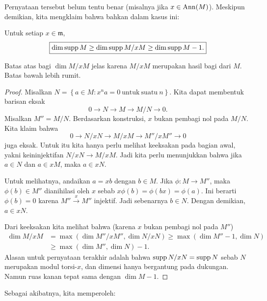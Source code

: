 Pernyataan tersebut belum tentu benar (misalnya jika $x \in \operatorname{Ann}(M)$). Meskipun demikian, kita mengklaim
bahwa bahkan dalam kasus ini:
\begin{proposition} 
Untuk setiap $x \in \mathfrak{m}$,
\[ \boxed{ \mathrm{dim} \operatorname{supp} M \geq \mathrm{dim} \operatorname{supp} M/xM \geq \mathrm{dim} \operatorname{supp} M -1 .}\]
\end{proposition} 
Batas atas bagi $\dim M/xM$ jelas karena $M/xM$ merupakan hasil bagi dari $M$. Batas
bawah lebih rumit. 

\begin{proof} 
Misalkan $N = \left\{a \in M: x^n a = 0 \ \mathrm{untuk \ suatu \ } n \right\}$. Kita dapat
membentuk barisan eksak
\[ 0 \to N \to M \to M/N \to 0.  \]
Misalkan $M'' = M/N$.
Berdasarkan konstruksi, $x$ bukan pembagi nol pada $M/N$. Kita klaim bahwa 
\[ 0 \to N/xN \to M/xM \to M''/xM'' \to 0  \]
juga eksak. Untuk itu kita hanya perlu melihat keeksakan pada bagian awal,
yakni keininjektifan $N/xN \to M/xM$. Jadi
kita perlu menunjukkan bahwa jika $a \in N$ dan $a \in xM$, maka $a \in x N$.

Untuk melihatnya, andaikan $a = xb$ dengan $b \in M$. Jika $\phi: M \to M''$, maka
$\phi(b) \in M''$ dianihilasi oleh $x$ sebab $x \phi(b) = \phi(bx) = \phi(a)$.
Ini berarti $\phi(b)=0$ karena $M'' \stackrel{x}{\to} M''$ injektif. Jadi
sebenarnya $b \in N$. Dengan demikian, $a \in xN$.

Dari keeksakan kita melihat bahwa (karena $x$ bukan pembagi nol pada $M''$)
\begin{align*} \dim M/xM & = \max (\dim M''/xM'', \dim N/xN) \geq \max(\dim M'' -1, \dim
N)\\ &  \geq \max( \dim M'', \dim N)-1  .  \end{align*}
Alasan untuk pernyataan terakhir adalah bahwa $\operatorname{supp} N/xN = \operatorname{supp} N$ sebab $N$ merupakan
modul torsi-$x$, dan dimensi hanya bergantung pada dukungan. Namun ruas kanan tepat sama dengan $\dim M -1$. 
\end{proof} 

Sebagai akibatnya, kita memperoleh:

